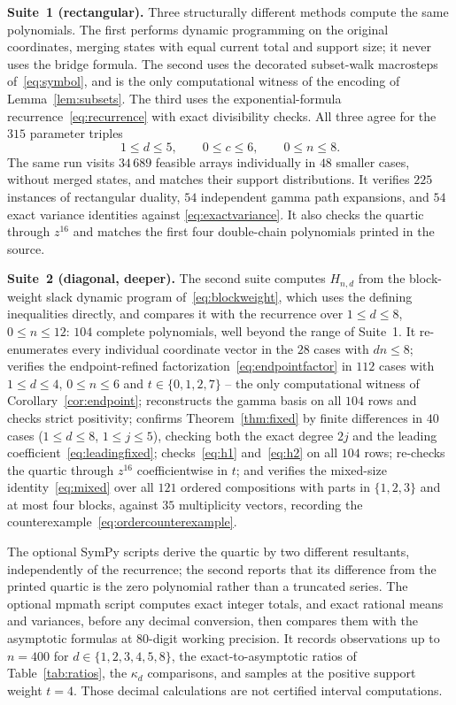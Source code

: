 \documentclass[11pt]{article}
\numberwithin{equation}{section}
\theoremstyle{definition}
\begin{document}
\medskip
\noindent\textbf{Suite~1 (rectangular).}
Three structurally different methods compute the same polynomials. The first
performs dynamic programming on the original coordinates, merging states with
equal current total and support size; it never uses the bridge formula. The
second uses the decorated subset-walk macrosteps of~\eqref{eq:symbol}, and is
the only computational witness of the encoding of Lemma~\ref{lem:subsets}. The
third uses the exponential-formula recurrence~\eqref{eq:recurrence} with
exact divisibility checks. All three agree for the $315$ parameter triples
\[
 1\leq d\leq5,\qquad0\leq c\leq6,\qquad0\leq n\leq8.
\]
The same run visits $34\,689$ feasible arrays individually in $48$ smaller
cases, without merged states, and matches their support distributions.
It verifies $225$ instances of rectangular duality, $54$ independent gamma
path expansions, and $54$ exact variance identities against
\eqref{eq:exactvariance}. It also checks the quartic through $z^{16}$ and
matches the first four double-chain polynomials printed in the source.

\medskip
\noindent\textbf{Suite~2 (diagonal, deeper).}
The second suite computes $H_{n,d}$ from the block-weight slack dynamic
program of~\eqref{eq:blockweight}, which uses the defining inequalities
directly, and compares it with the recurrence over
$1\leq d\leq8$, $0\leq n\leq12$: $104$ complete polynomials, well beyond the
range of Suite~1. It re-enumerates every individual coordinate vector in the
$28$ cases with $dn\leq8$; verifies the endpoint-refined
factorization~\eqref{eq:endpointfactor} in $112$ cases with
$1\leq d\leq4$, $0\leq n\leq6$ and $t\in\{0,1,2,7\}$ -- the only computational
witness of Corollary~\ref{cor:endpoint}; reconstructs the gamma basis on all
$104$ rows and checks strict positivity; confirms
Theorem~\ref{thm:fixed} by finite differences in $40$ cases
($1\leq d\leq8$, $1\leq j\leq5$), checking both the exact degree $2j$ and the
leading coefficient~\eqref{eq:leadingfixed}; checks~\eqref{eq:h1}
and~\eqref{eq:h2} on all $104$ rows; re-checks the quartic through $z^{16}$
coefficientwise in $t$; and verifies the mixed-size
identity~\eqref{eq:mixed} over all $121$ ordered compositions with parts in
$\{1,2,3\}$ and at most four blocks, against $35$ multiplicity vectors,
recording the counterexample~\eqref{eq:ordercounterexample}.

\medskip
The optional SymPy scripts derive the quartic by two different resultants,
independently of the recurrence; the second reports that its difference from
the printed quartic is the zero polynomial rather than a truncated series.
The optional mpmath script computes exact integer totals, and exact rational
means and variances, before any decimal conversion, then compares them with
the asymptotic formulas at $80$-digit working precision. It records
observations up to $n=400$ for $d\in\{1,2,3,4,5,8\}$, the exact-to-asymptotic
ratios of Table~\ref{tab:ratios}, the $\kappa_d$ comparisons, and samples at
the positive support weight $t=4$. Those decimal calculations are not
certified interval computations.
\end{document}
